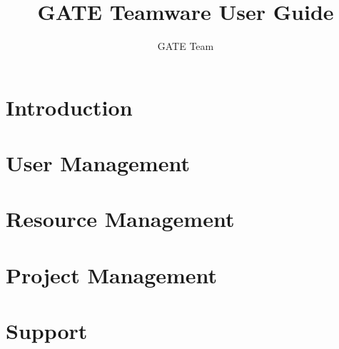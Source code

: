 \documentclass{report}
\title{GATE Teamware User Guide}
\author{GATE Team}
\begin{document}
\maketitle{}

\tableofcontents

\chapter{Introduction}


\chapter{User Management}


\chapter{Resource Management}


\chapter{Project Management}


\chapter{Support}

\end{document}
